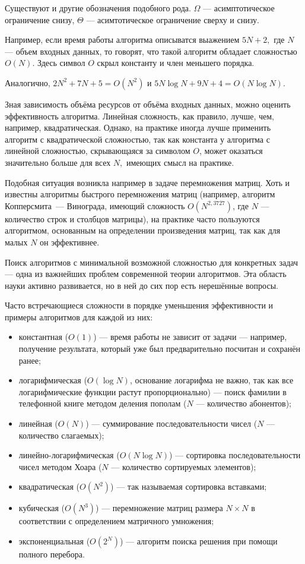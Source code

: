 Существуют и другие обозначения подобного рода. $\Omega$ —
асимптотическое ограничение снизу, $\Theta$ — асимтотическое
ограничение сверху и снизу.

Например, если время работы алгоритма описыватся выажением $5N+2,$
где $N$ — объем входных данных, то говорят, что такой алгоритм
обладает сложностью $O(N)$. Здесь символ $O$ скрыл константу и член
меньшего порядка.

Аналогично, $2N^2+7N+5 = O(N^2)$ и $5N\log N + 9N + 4 = O(N\log N)$.

Зная зависимость объёма ресурсов от объёма входных данных, можно
оценить эффективность алгоритма. Линейная сложность, как правило,
лучше, чем, например, квадратическая.  Однако, на практике иногда
лучше применить алгоритм с квадратической сложностью, так как
константа у алгоритма с линейной сложностью, скрывающаяся за символом
$O$, может оказаться значительно больше для всех $N,$ имеющих смысл на
практике.

Подобная ситуация возникла например в задаче перемножения матриц. Хоть
и известны алгоритмы быстрого перемножения матриц (например, алгоритм
Копперсмита~— Винограда, имеющий сложность $O(N^{2{,}3727})$, где $N$
— количество строк и столбцов матрицы), на практике часто пользуются
алгоритмом, основанным на определении произведения матриц, так как для
малых $N$ он эффективнее.

Поиск алгоритмов с минимальной возможной сложностью для конкретных
задач — одна из важнейших проблем современной теории алгоритмов. Эта
область науки активно развивается, но в ней до сих пор есть нерешённые
вопросы.

Часто встречающиеся сложности в порядке уменьшения эффективности и
примеры алгоритмов для каждой из них:

\begin{itemize}
\item константная ($O(1)$) — время работы не зависит от задачи —
  например, получение результата, который уже был предварительно
  посчитан и сохранён ранее;
\item логарифмическая ($O(\log N)$, основание логарифма не важно, так
  как все логарифмические функции растут пропорционально) — поиск
  фамилии в телефонной книге методом деления пополам ($N$ — количество
  абонентов);
\item линейная ($O(N)$) — суммирование последовательности чисел ($N$ —
  количество слагаемых);
\item линейно-логарифмическая ($O(N\log N)$) — сортировка
  последовательности чисел методом Хоара ($N$ — количество сортируемых
  элементов);
\item квадратическая ($O(N^{2})$) — так называемая сортировка вставками;
\item кубическая ($O(N^{3})$) — перемножение матриц размера $N\times
  N$ в соответствии с определением матричного умножения;
\item экспоненциальная ($O(2^{N})$) — алгоритм поиска решения при
  помощи полного перебора.
\end{itemize}

